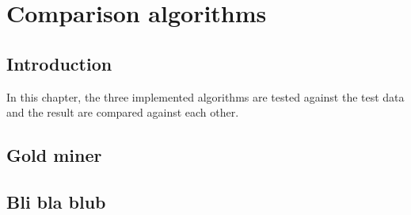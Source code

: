 
\chapter{Comparison algorithms} %

\label{Chapter5} %



\section{Introduction}

In this chapter, the three implemented algorithms are tested against the test data and the result are compared against each other.

\section{Gold miner}
\section{Bli bla blub}

